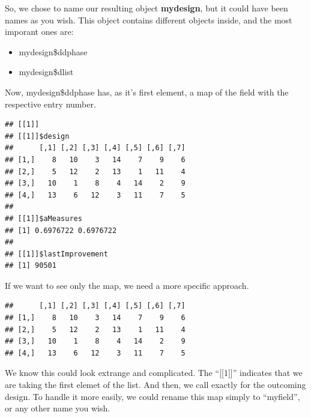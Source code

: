\documentclass[
]{book}
\newenvironment{Shaded}{\begin{snugshade}}{\end{snugshade}}
\newcommand{\DecValTok}[1]{\textcolor[rgb]{0.00,0.00,0.81}{#1}}
\newcommand{\NormalTok}[1]{#1}
\newcommand{\SpecialCharTok}[1]{\textcolor[rgb]{0.00,0.00,0.00}{#1}}
\providecommand{\tightlist}{%
  \setlength{\itemsep}{0pt}\setlength{\parskip}{0pt}}
\begin{document}
So, we chose to name our resulting object \textbf{mydesign}, but it could have been names as you wish. This object contains different objects inside, and the most imporant ones are:

\begin{itemize}
\tightlist
\item
  mydesign\$ddphase
\item
  mydesign\$dlist
\end{itemize}

Now, mydesign\$ddphase has, as it's first element, a map of the field with the respective entry number.

\begin{Shaded}
\end{Shaded}

\begin{verbatim}
## [[1]]
## [[1]]$design
##      [,1] [,2] [,3] [,4] [,5] [,6] [,7]
## [1,]    8   10    3   14    7    9    6
## [2,]    5   12    2   13    1   11    4
## [3,]   10    1    8    4   14    2    9
## [4,]   13    6   12    3   11    7    5
## 
## [[1]]$aMeasures
## [1] 0.6976722 0.6976722
## 
## [[1]]$lastImprovement
## [1] 90501
\end{verbatim}

If we want to see only the map, we need a more specific approach.

\begin{Shaded}
\end{Shaded}

\begin{verbatim}
##      [,1] [,2] [,3] [,4] [,5] [,6] [,7]
## [1,]    8   10    3   14    7    9    6
## [2,]    5   12    2   13    1   11    4
## [3,]   10    1    8    4   14    2    9
## [4,]   13    6   12    3   11    7    5
\end{verbatim}

We know this could look extrange and complicated. The ``{[}{[}1{]}{]}'' indicates that we are taking the first elemet of the list. And then, we call exactly for the outcoming design. To handle it more easily, we could rename this map simply to ``myfield'', or any other name you wish.
\end{document}
